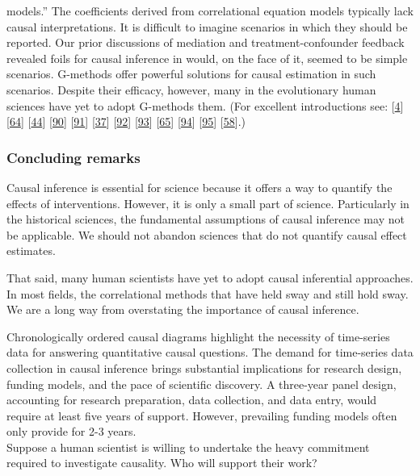 \documentclass[
  singlecolumn]{article}
\begin{document}
\begin{enumerate}
  models.'' The coefficients derived from correlational equation models
  typically lack causal interpretations. It is difficult to imagine
  scenarios in which they should be reported. Our prior discussions of
  mediation and treatment-confounder feedback revealed foils for causal
  inference in would, on the face of it, seemed to be simple scenarios.
  G-methods offer powerful solutions for causal estimation in such
  scenarios. Despite their efficacy, however, many in the evolutionary
  human sciences have yet to adopt G-methods them. (For excellent
  introductions see: {[}\protect\hyperlink{ref-hernuxe1n2023}{4}{]}
  {[}\protect\hyperlink{ref-duxedaz2021}{64}{]}
  {[}\protect\hyperlink{ref-vanderweele2015}{44}{]}
  {[}\protect\hyperlink{ref-hoffman2022}{90}{]}
  {[}\protect\hyperlink{ref-hoffman2023}{91}{]}
  {[}\protect\hyperlink{ref-chatton2020}{37}{]}
  {[}\protect\hyperlink{ref-shiba2021}{92}{]}
  {[}\protect\hyperlink{ref-sjuxf6lander2016}{93}{]}
  {[}\protect\hyperlink{ref-breskin2020}{65}{]}
  {[}\protect\hyperlink{ref-vanderweele2009a}{94}{]}
  {[}\protect\hyperlink{ref-vansteelandt2012}{95}{]}
  {[}\protect\hyperlink{ref-shi2021}{58}{]}.)
\end{enumerate}

\hypertarget{concluding-remarks}{%
\subsubsection{Concluding remarks}\label{concluding-remarks}}

Causal inference is essential for science because it offers a way to
quantify the effects of interventions. However, it is only a small part
of science. Particularly in the historical sciences, the fundamental
assumptions of causal inference may not be applicable. We should not
abandon sciences that do not quantify causal effect estimates.

That said, many human scientists have yet to adopt causal inferential
approaches. In most fields, the correlational methods that have held
sway and still hold sway. We are a long way from overstating the
importance of causal inference.

Chronologically ordered causal diagrams highlight the necessity of
time-series data for answering quantitative causal questions. The demand
for time-series data collection in causal inference brings substantial
implications for research design, funding models, and the pace of
scientific discovery. A three-year panel design, accounting for research
preparation, data collection, and data entry, would require at least
five years of support. However, prevailing funding models often only
provide for 2-3 years.\\
Suppose a human scientist is willing to undertake the heavy commitment
required to investigate causality. Who will support their work?
\end{document}
